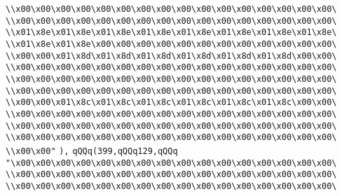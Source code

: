 \verb|\\x00\x00\x00\x00\x00\x00\x00\x00\x00\x00\x00\x00\x00\x00\x00\x00\|\newline
\verb|\\x00\x00\x00\x00\x00\x00\x00\x00\x00\x00\x00\x00\x00\x00\x00\x00\|\newline
\verb|\\x01\x8e\x01\x8e\x01\x8e\x01\x8e\x01\x8e\x01\x8e\x01\x8e\x01\x8e\|\newline
\verb|\\x01\x8e\x01\x8e\x00\x00\x00\x00\x00\x00\x00\x00\x00\x00\x00\x00\|\newline
\verb|\\x00\x00\x01\x8d\x01\x8d\x01\x8d\x01\x8d\x01\x8d\x01\x8d\x00\x00\|\newline
\verb|\\x00\x00\x00\x00\x00\x00\x00\x00\x00\x00\x00\x00\x00\x00\x00\x00\|\newline
\verb|\\x00\x00\x00\x00\x00\x00\x00\x00\x00\x00\x00\x00\x00\x00\x00\x00\|\newline
\verb|\\x00\x00\x00\x00\x00\x00\x00\x00\x00\x00\x00\x00\x00\x00\x00\x00\|\newline
\verb|\\x00\x00\x01\x8c\x01\x8c\x01\x8c\x01\x8c\x01\x8c\x01\x8c\x00\x00\|\newline
\verb|\\x00\x00\x00\x00\x00\x00\x00\x00\x00\x00\x00\x00\x00\x00\x00\x00\|\newline
\verb|\\x00\x00\x00\x00\x00\x00\x00\x00\x00\x00\x00\x00\x00\x00\x00\x00\|\newline
\verb|\\x00\x00\x00\x00\x00\x00\x00\x00\x00\x00\x00\x00\x00\x00\x00\x00\|\newline
\verb|\\x00\x00"|\newline
\verb|),|\newline
\verb|qQQq(399,qQQq129,qQQq|\newline
\verb|"\x00\x00\x00\x00\x00\x00\x00\x00\x00\x00\x00\x00\x00\x00\x00\x00\|\newline
\verb|\\x00\x00\x00\x00\x00\x00\x00\x00\x00\x00\x00\x00\x00\x00\x00\x00\|\newline
\verb|\\x00\x00\x00\x00\x00\x00\x00\x00\x00\x00\x00\x00\x00\x00\x00\x00\|\newline
